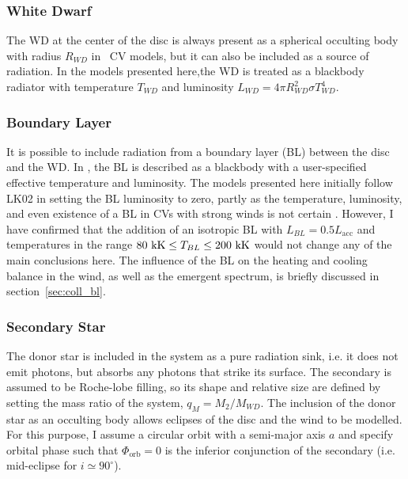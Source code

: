 \subsubsection{White Dwarf}

The WD at the center of the disc is always present as a spherical occulting
body with radius $R_{WD}$ in \py\ CV models, but it can also be included
as a source of radiation. In the models presented here,the
WD is treated as a blackbody radiator with temperature $T_{WD}$ and luminosity
$L_{WD} = 4\pi R_{WD}^2 \sigma T_{WD}^4$. 

\subsubsection{Boundary Layer}

It is possible to include radiation from a boundary layer (BL) between
the disc and the WD. In \py, the BL is described as
a blackbody with a user-specified effective temperature and
luminosity. The models presented here initially follow LK02 in setting
the BL luminosity to zero, partly as the temperature, luminosity, and even
existence of a BL in CVs with strong winds is not certain \citep{hoaredrew1993}.
However, I have confirmed that the addition 
of an isotropic BL with $L_{BL} = 0.5 L_{\mathrm{acc}}$ and temperatures in 
the range $80~{\rm kK} \leq T_{BL} \leq 200~{\rm kK}$ would not change 
any of the main conclusions here. 
The influence of the BL on the heating and cooling balance
in the wind, as well as the emergent spectrum, is briefly discussed in
section~\ref{sec:coll_bl}.


\subsubsection{Secondary Star}

The donor star is included in the system as a pure radiation sink, 
i.e. it does not emit photons, but absorbs any photons that strike its
surface. The secondary is assumed to be Roche-lobe filling, so its
shape and relative size are defined by setting the mass ratio of the system, 
$q_M = M_2/M_{WD}$. The inclusion of the donor star as an occulting body
allows eclipses of the disc and the wind to be modelled. For this
purpose, I assume a circular orbit with a semi-major axis $a$ and 
specify orbital phase such that $\Phi_{\mathrm{orb}} = 0$ is the
inferior conjunction of the secondary (i.e. mid-eclipse for $i \simeq
90^\circ$).




